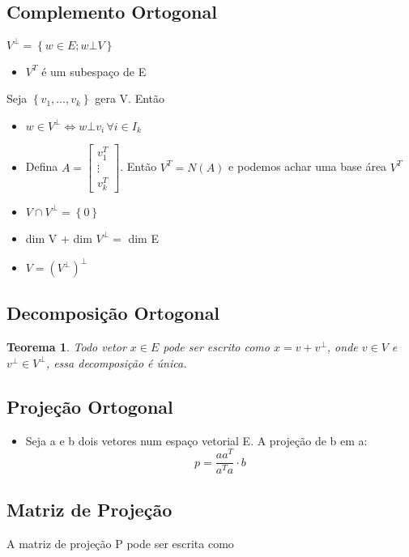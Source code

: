 \documentclass[12pt]{article}
\newtheorem{theorem}{Teorema}
\begin{document}
\subsection*{Complemento Ortogonal}
$V^\bot = \left\{w \in E ; w \bot V\right\}$
\begin{itemize}
    \item $V^T$ é um subespaço de E
\end{itemize}
Seja $\left\{v_1, \dots, v_k\right\}$ gera V. Então
\begin{itemize}
    \item $w \in V^\bot \iff w \bot v_i \, \forall i \in I_k$
    \item Defina $A = \left[ \begin{array}{cc}
    v_1^T \\
    \vdots \\
    v_k^T \end{array} \right]$. Então $V^T = N(A)$ e podemos achar uma base área $V^T$
    \item $V \cap V^\bot = \left\{0\right\}$
    \item dim V + dim $V^\bot = $ dim E
    \item $V = (V^\bot)^\bot$
\end{itemize}

\subsection*{Decomposição Ortogonal}

\begin{theorem}
Todo vetor $x \in E$ pode ser escrito como $x = v + v^\bot$, onde $v \in V$ e $v^\bot \in V^\bot$, essa decomposição é única.
\end{theorem}

\subsection*{Projeção Ortogonal}
\begin{itemize}
    \item Seja a e b dois vetores num espaço vetorial E. A projeção de b em a:
    $$p = \dfrac{a a^T}{a^T a} \cdot b$$
\end{itemize}

\subsection*{Matriz de Projeção}
A matriz de projeção P pode ser escrita como
\end{document}
